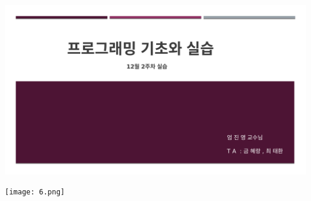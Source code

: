 \documentclass[11pt,a4paper]{article}
\begin{document}
\begin{enumerate}
\includegraphics[page=5, width=\textwidth]{1.pdf}
	
\texttt{[image: 6.png]}	


\end{enumerate}
\end{document}
